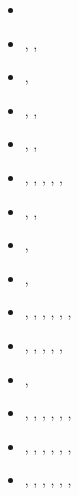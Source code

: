 \begin{small}
\begin{itemize}
\item[\nineteenninetythree]  \textcite{wibf93}
\item[\nineteenninetyfour]   \textcite{wibe94},  \textcite{befh94},  \textcite{bequ94}
\item[\nineteenninetyfive]   \textcite{full95},  \textcite{elfb95}
\item[\nineteenninetysix]    \textcite{bekh96},  \textcite{beeh96},  \textcite{wabe96}
\item[\nineteenninetyeight]  \textcite{elbj98},  \textcite{jabf98},  \textcite{wabb98}
\item[\nineteenninetynine]   \textcite{will99a}, \textcite{will99b}, \textcite{elbp99},
                             \textcite{elbe99},  \textcite{beep99},  \textcite{pelj99}
\item[\twothousand]          \textcite{pybf00},  \textcite{bemh00},  \textcite{pfeb00}
\item[\twothousandone]       \textcite{bejn01},  \textcite{pysk01}
\item[\twothousandtwo]       \textcite{hube02},  \textcite{pybf02}
\item[\twothousandthree]     \textcite{hube03},  \textcite{vamf03},  \textcite{wipo03}, 
                             \textcite{pymi03},  \textcite{bupf03},  \textcite{wiep03},
                             \textcite{pysh03}
\item[\twothousandfour]      \textcite{bejn04},  \textcite{pycr04},  \textcite{pybe04}, 
                             \textcite{elsp04},  \textcite{geim04},  \textcite{jabm04}
\item[\twothousandfive]      \textcite{gebi05},  \textcite{hubb05}
\item[\twothousandsix]       \textcite{pysk06},  \textcite{selz06},  \textcite{pabs06}, 
                             \textcite{jabn06},  \textcite{benj06},  \textcite{cubj06},
                             \textcite{crnp06}
\item[\twothousandseven]     \textcite{hube07},  \textcite{cubh07},  \textcite{mohb07}, 
                             \textcite{sebp07},  \textcite{buto07b}, \textcite{jabn07}, 
                             \textcite{shpy07}
\item[\twothousandeight]     \textcite{sebp08},  \textcite{wabj08},  \textcite{wabj08b}, 
                             \textcite{gopy08},  \textcite{buhb08},  \textcite{hube08}, 
                             \textcite{cuhb08}

\end{itemize}
\end{small}
